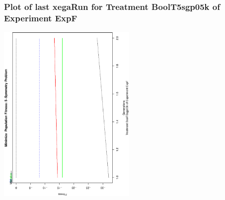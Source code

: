  \begin{frame}
 \frametitle{ Plot of last xegaRun for Treatment BoolT5sgp05k of Experiment ExpF }
 \begin{center}
\includegraphics[width=0.5\textwidth, angle=-90]
{ExpFPlotPopStatsFigure003.eps}
 \end{center}
 \label{report/ExpFPlotPopStatsFigure003.eps}  
 \end{frame}

